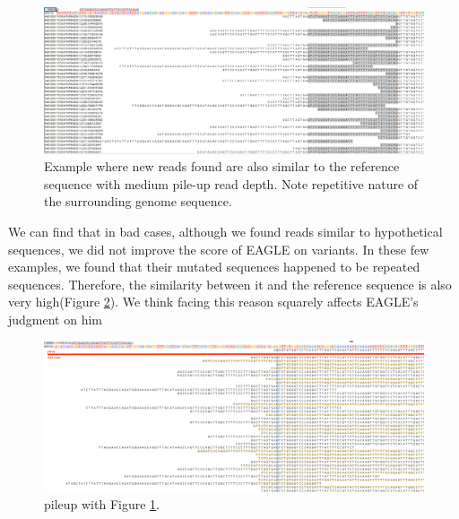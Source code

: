 \begin{figure}[H]
    \centering
    \includegraphics[width=1\columnwidth]{body/image/mid_new_REFread.png}
    \captionsetup{labelfont=bf}
    \renewcommand{\baselinestretch}{1.0}
    \vspace{-1cm}
    \caption[New reads are similar to the reference with medium pile-up read depth]{Example where new reads found are also similar to the reference sequence with medium pile-up read depth.  Note repetitive nature of the surrounding genome sequence.}
    \label{mid_new_REFread}
\end{figure}

We can find that in bad cases, although we found reads similar to hypothetical sequences, we did not improve the score of EAGLE on variants. In these few examples, we found that their mutated sequences happened to be repeated sequences. Therefore, the similarity between it and the reference sequence is also very high(Figure \ref{mid_pileup_REFread}). We think facing this reason squarely affects EAGLE's judgment on him

\vspace{1cm}
\begin{figure}[H]
    \centering
    \includegraphics[width=1\columnwidth]{body/image/mid_pileup_REFread.png}
    \captionsetup{labelfont=bf}
    \renewcommand{\baselinestretch}{1.0}
    \vspace{-1cm}
    \caption[pileup with Figure \ref{mid_new_REFread}]{pileup with Figure \ref{mid_new_REFread}.}
    \label{mid_pileup_REFread}
\end{figure}


